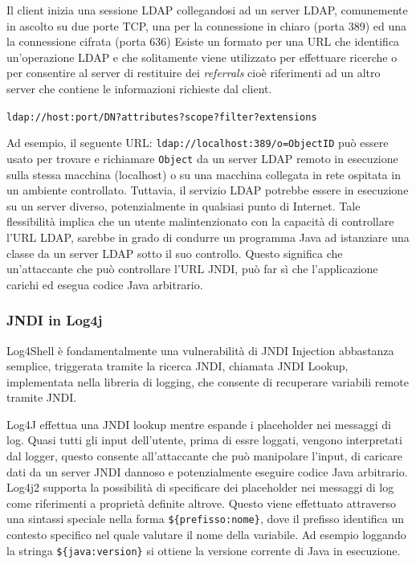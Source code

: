 \documentclass[a4paper, 12pt]{article}
\begin{document}
Il client inizia una sessione LDAP collegandosi ad un server LDAP, comunemente in ascolto su due porte TCP, una per la connessione in chiaro (porta 389) ed una la connessione cifrata (porta 636)
Esiste un formato per una URL che identifica un'operazione LDAP e che solitamente viene utilizzato per effettuare ricerche o per consentire al server di restituire dei \emph{referrals} cioè riferimenti ad un altro server che contiene le informazioni richieste dal client.
\begin{center}
    \verb!ldap://host:port/DN?attributes?scope?filter?extensions!
\end{center}

Ad esempio, il seguente URL: \verb!ldap://localhost:389/o=ObjectID! può essere usato per trovare e richiamare \verb!Object! da un server LDAP remoto in esecuzione sulla stessa macchina (localhost) o su una macchina collegata in rete ospitata in un ambiente controllato.
Tuttavia, il servizio LDAP potrebbe essere in esecuzione su un server diverso, potenzialmente in qualsiasi punto di Internet. Tale flessibilità implica che un utente malintenzionato con la capacità di controllare l'URL LDAP, sarebbe in grado di condurre un programma Java ad istanziare una classe da un server LDAP sotto il suo controllo. 
Questo significa che un'attaccante che può controllare l'URL JNDI, può far sì che l'applicazione carichi ed esegua codice Java arbitrario.


\subsubsection{JNDI in Log4j}
Log4Shell è fondamentalmente una vulnerabilità di JNDI Injection abbastanza semplice, triggerata tramite la ricerca JNDI, chiamata JNDI Lookup, implementata nella libreria di logging, che consente di recuperare variabili remote tramite JNDI.

Log4J effettua una JNDI lookup mentre espande i placeholder nei messaggi di log. Quasi tutti gli input dell'utente, prima di essre loggati, vengono interpretati dal logger, questo consente all'attaccante che può manipolare l'input, di caricare dati da un server JNDI dannoso e potenzialmente eseguire codice Java arbitrario.
Log4j2 supporta la possibilità di specificare dei placeholder nei messaggi di log come riferimenti a proprietà definite altrove. Questo viene effettuato attraverso una sintassi speciale nella forma \verb!${prefisso:nome}!, dove il prefisso identifica un contesto specifico nel quale valutare il nome della variabile.
Ad esempio loggando la stringa \verb!${java:version}! si ottiene la versione corrente di Java in esecuzione.
\end{document}

